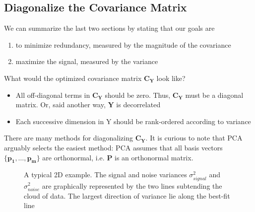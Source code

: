 \subsection{Diagonalize the Covariance Matrix}
We can summarize the last two sections by stating that our goals are

\begin{enumerate}
\item to minimize redundancy, measured by the magnitude of the covariance
\item maximize the signal, measured by the variance
\end{enumerate}  
What would the optimized covariance matrix $\pmb{C_Y}$ look like?
\begin{itemize}
\item All off-diagonal terms in $\pmb{C_Y}$ should be zero. Thus, $\pmb{C_Y}$ must be a diagonal matrix. Or, said another way, $\pmb{Y}$ is decorrelated
\item Each successive dimension in Y should be rank-ordered according to variance
\end{itemize} 
There are many methods for diagonalizing $\pmb{C_Y}$. It is curious to note that PCA arguably selects the easiest method: PCA assumes that all basis vectors $\{\pmb{p_1 , \dots , p_m} \}$ are orthonormal, i.e. $\pmb{P}$ is an orthonormal matrix.


\begin{figure}[!htbp]
\centering
{}
\caption{A typical 2D example. The signal and noise variances $\sigma^2_{signal}$ and $\sigma^2_{noise}$ are graphically represented by the two lines subtending the cloud of data. The largest direction of variance lie along the best-fit line}
\label{fig2}
\end{figure}

